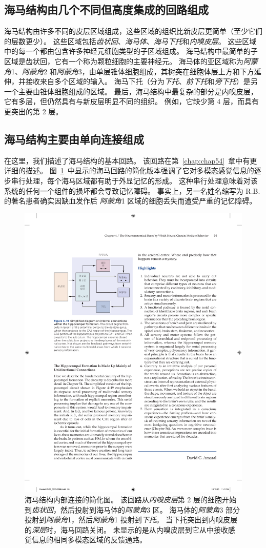 \subsection{海马结构由几个不同但高度集成的回路组成}

海马结构由许多不同的皮层区域组成，这些区域的组织比新皮层更简单（至少它们的层数更少）。
这些区域包括\textit{齿状回}、\textit{海马体}、\textit{海马下托}和\textit{内嗅皮层}。 
这些区域中的每一个都由包含许多神经元细胞类型的子区域组成。
海马结构中最简单的子区域是齿状回，它有一个称为颗粒细胞的主要神经元。
海马体的亚区域称为\textit{阿蒙角}1、\textit{阿蒙角}2 和\textit{阿蒙角}3，由单层锥体细胞组成，其树突在细胞体层上方和下方延伸，并接收来自多个区域的输入。
海马下托（分为\textit{下托}、\textit{前下托}和\textit{旁下托}）是另一个主要由锥体细胞组成的区域。
最后，海马结构中最复杂的部分是内嗅皮层，它有多层，但仍然具有与新皮层明显不同的组织。
例如，它缺少第 4 层，而具有更突出的第 2 层。



\subsection{海马结构主要由单向连接组成}

在这里，我们描述了海马结构的基本回路。
该回路在第~\ref{chap:chap54}~章中有更详细的描述。
图~\ref{fig:4_19}~中显示的海马回路的简化版本强调了它对多模态感觉信息的逐步串行处理，每个海马区域都有助于外显记忆的形成。
这种串行处理意味着对该系统的任何一个组件的损坏都会导致记忆障碍。
事实上，另一名姓名缩写为 R.B. 的著名患者确实因缺血发作后 \textit{阿蒙角}1 区域的细胞丢失而遭受严重的记忆障碍。


\begin{figure}[htbp]
	\centering
	\includegraphics[width=0.6\linewidth]{chap04/fig_4_19}
	\caption{海马结构内部连接的简化图。 
		该回路从\textit{内嗅皮层}第 2 层的细胞开始到\textit{齿状回}，然后投射到海马体的\textit{阿蒙角}3 区。
		海马体的\textit{阿蒙角}3 部分投射到\textit{阿蒙角}1，然后\textit{阿蒙角}1 投射到\textit{下托}。
		当下托突出到内嗅皮层的\textit{深层}时，海马回路关闭。
		未显示的是从内嗅皮层到它从中接收感觉信息的相同多模态区域的反馈通路。}
	\label{fig:4_19}
\end{figure}


